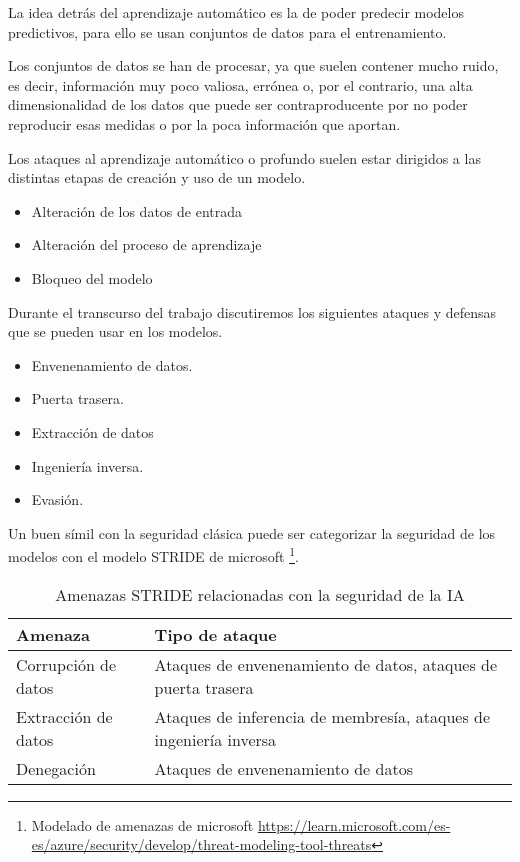 La idea detrás del aprendizaje automático es la de poder predecir modelos predictivos, para ello se usan conjuntos de datos para el entrenamiento.

Los conjuntos de datos se han de procesar, ya que suelen contener mucho ruido, es decir, información muy poco valiosa, errónea o, por el contrario, una alta dimensionalidad de los datos que puede ser contraproducente por no poder reproducir esas medidas o por la poca información que aportan.

Los ataques al aprendizaje automático o profundo suelen estar dirigidos a las distintas etapas de creación y uso de un modelo.

\begin{itemize}
    \item Alteración de los datos de entrada
    \item Alteración del proceso de aprendizaje
    \item Bloqueo del modelo
\end{itemize}

Durante el transcurso del trabajo discutiremos los siguientes ataques y defensas que se pueden usar en los modelos.

\begin{itemize}
    \item Envenenamiento de datos.
    \item Puerta trasera.
    \item Extracción de datos
    \item Ingeniería inversa.
    \item Evasión.
\end{itemize}

Un buen símil con la seguridad clásica puede ser categorizar la seguridad de los modelos con el modelo \gls{STRIDE} de microsoft \footnote{Modelado de amenazas de microsoft \url{https://learn.microsoft.com/es-es/azure/security/develop/threat-modeling-tool-threats}}.

\begin{landscape}

    \begin{table}[ht!]
        \centering
        \small
        \def\arraystretch{1.5}
        \begin{tabular}{lp{10cm}}
            \toprule
            \textbf{Amenaza}    & \textbf{Tipo de ataque}                                           \\
            \midrule
            Corrupción de datos & Ataques de envenenamiento de datos, ataques de puerta trasera     \\
            Extracción de datos & Ataques de inferencia de membresía, ataques de ingeniería inversa \\
            Denegación          & Ataques de envenenamiento de datos                                \\
            \bottomrule
        \end{tabular}
        \caption{Amenazas STRIDE relacionadas con la seguridad de la IA}
        \label{Tabla.Requisitos}
    \end{table}

\end{landscape}
\restoregeometry
